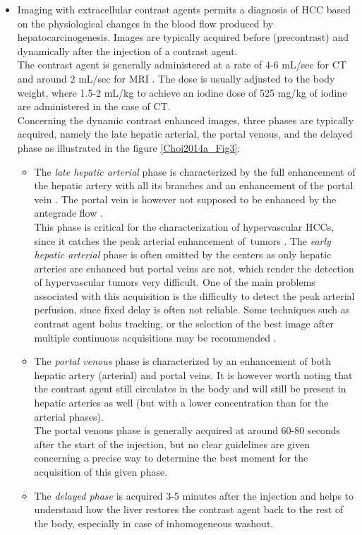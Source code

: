 \documentclass[]{article}
\begin{document}
\begin{itemize}
\item Imaging with extracellular contrast agents permits a diagnosis of
  HCC based on the physiological changes in the blood flow
  produced by hepatocarcinogenesis. Images are typically acquired before (precontrast) and dynamically
  after the injection of a contrast agent.\\
  The contrast agent is generally administered at a rate of 4-6 mL/sec
  for CT and around 2 mL/sec for MRI \cite{Schima2005, Frydrychowicz2012}. The dose is usually adjusted to the body weight, where 1.5-2
  mL/kg to achieve an iodine dose of 525 mg/kg of iodine are
  administered in the case of CT.\\
  Concerning the dynamic contrast enhanced images, three phases are
  typically acquired, namely the late hepatic arterial, the portal
  venous, and the delayed phase as illustrated in the figure \ref{Choi2014a_Fig3}:
  \begin{itemize}
  \item The \emph{late hepatic arterial} phase is characterized by the full
    enhancement of the hepatic artery with all its branches and an
    enhancement of the portal vein \cite{Choi2014}.
    The portal vein is however not supposed to be enhanced by the
    antegrade flow \cite{Miraglia2007}.\\
    This phase is critical for the characterization of hypervascular
    HCCs, since it catches the peak arterial enhancement
    of~tumors \cite{Kim2006}. The \emph{early
    hepatic arterial} phase is often omitted by the centers as only
    hepatic arteries are enhanced but portal veins are not, which render
    the detection of hypervascular tumors very difficult. One of the
    main problems associated with this acquisition is the difficulty to
    detect the peak arterial perfusion, since fixed delay is often not
    reliable. Some techniques such as contrast agent bolus tracking, or
    the selection of the best image after multiple continuous
    acquisitions may be recommended \cite{Earls1997}.
  \item The \emph{portal venous} phase is characterized by an enhancement of
    both hepatic artery (arterial) and portal veins. It is however worth
    noting that the contrast agent still circulates in the body and will
    still be present in hepatic arteries as well (but with a lower
    concentration than for the arterial phases).\\
    The portal venous phase is generally acquired at around 60-80
    seconds after the start of the injection, but no clear guidelines
    are given concerning a precise way to determine the best moment for
    the acquisition of this given phase.
  \item The \emph{delayed phase} is acquired 3-5 minutes after the injection
    and helps to understand how the liver restores the contrast agent
    back to the rest of the body, especially in case of inhomogeneous
    washout.
  \end{itemize}
\end{itemize}
\end{document}
